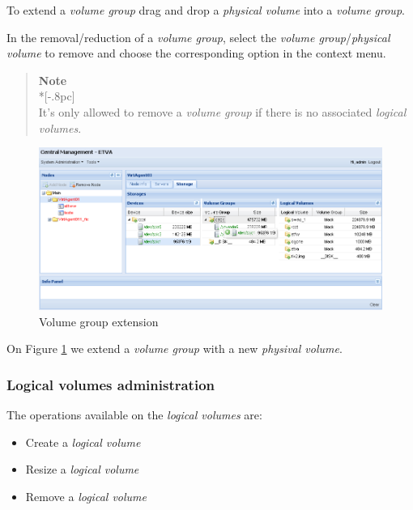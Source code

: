 To extend a \emph{volume group} drag and drop a \emph{physical volume} into a \emph{volume group}.

In the removal/reduction of a \emph{volume group}, select the \emph{volume group}/\emph{physical volume} to remove and choose the corresponding option in the context menu.

\begin{quote}
	{\large \bf Note} \\*[-.8pc]
	\underline{\hspace{6in}} \\
    It's only allowed to remove a \emph{volume group} if there is no associated \emph{logical volumes}.
\end{quote}
 
\begin{figure}[H]
        \begin{center}
        \includegraphics[scale=0.45]{screenshots/storage_vg_extend.png}
        \caption{Volume group extension}
        \label{fig:storage_vg_extend}
        \end{center}
\end{figure}

On Figure \ref{fig:storage_vg_extend} we extend a \emph{volume group} with a new \emph{physival volume}.


\subsubsection{Logical volumes administration}

The operations available on the \emph{logical volumes} are:
\begin{itemize}
	\item Create a \emph{logical volume}
	\item Resize a \emph{logical volume}
	\item Remove a \emph{logical volume}
\end{itemize}

